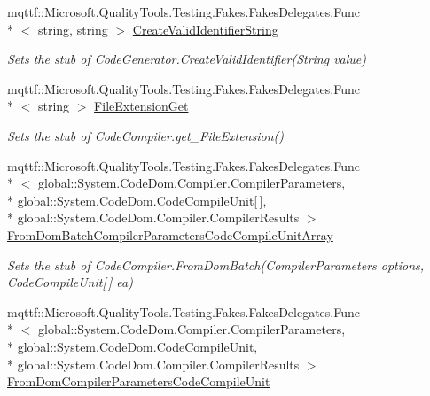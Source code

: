 \begin{DoxyCompactItemize}
mqttf\-::\-Microsoft.\-Quality\-Tools.\-Testing.\-Fakes.\-Fakes\-Delegates.\-Func\\*
$<$ string, string $>$ \hyperlink{class_system_1_1_code_dom_1_1_compiler_1_1_fakes_1_1_stub_code_compiler_a9d6d125dea0e8d09c5cde16f86229fbf}{Create\-Valid\-Identifier\-String}
\begin{DoxyCompactList}\small\item\em Sets the stub of Code\-Generator.\-Create\-Valid\-Identifier(\-String value)\end{DoxyCompactList}\item 
mqttf\-::\-Microsoft.\-Quality\-Tools.\-Testing.\-Fakes.\-Fakes\-Delegates.\-Func\\*
$<$ string $>$ \hyperlink{class_system_1_1_code_dom_1_1_compiler_1_1_fakes_1_1_stub_code_compiler_ada9b977e63d6bedafb9ce7e72bd43635}{File\-Extension\-Get}
\begin{DoxyCompactList}\small\item\em Sets the stub of Code\-Compiler.\-get\-\_\-\-File\-Extension()\end{DoxyCompactList}\item 
mqttf\-::\-Microsoft.\-Quality\-Tools.\-Testing.\-Fakes.\-Fakes\-Delegates.\-Func\\*
$<$ global\-::\-System.\-Code\-Dom.\-Compiler.\-Compiler\-Parameters, \\*
global\-::\-System.\-Code\-Dom.\-Code\-Compile\-Unit\mbox{[}$\,$\mbox{]}, \\*
global\-::\-System.\-Code\-Dom.\-Compiler.\-Compiler\-Results $>$ \hyperlink{class_system_1_1_code_dom_1_1_compiler_1_1_fakes_1_1_stub_code_compiler_aed057f272ff5abb624bb3f01efb03d2c}{From\-Dom\-Batch\-Compiler\-Parameters\-Code\-Compile\-Unit\-Array}
\begin{DoxyCompactList}\small\item\em Sets the stub of Code\-Compiler.\-From\-Dom\-Batch(\-Compiler\-Parameters options, Code\-Compile\-Unit\mbox{[}$\,$\mbox{]} ea)\end{DoxyCompactList}\item 
mqttf\-::\-Microsoft.\-Quality\-Tools.\-Testing.\-Fakes.\-Fakes\-Delegates.\-Func\\*
$<$ global\-::\-System.\-Code\-Dom.\-Compiler.\-Compiler\-Parameters, \\*
global\-::\-System.\-Code\-Dom.\-Code\-Compile\-Unit, \\*
global\-::\-System.\-Code\-Dom.\-Compiler.\-Compiler\-Results $>$ \hyperlink{class_system_1_1_code_dom_1_1_compiler_1_1_fakes_1_1_stub_code_compiler_aa809ba1ccd9ad11400f74dd1ef97be1c}{From\-Dom\-Compiler\-Parameters\-Code\-Compile\-Unit}

\end{DoxyCompactItemize}
